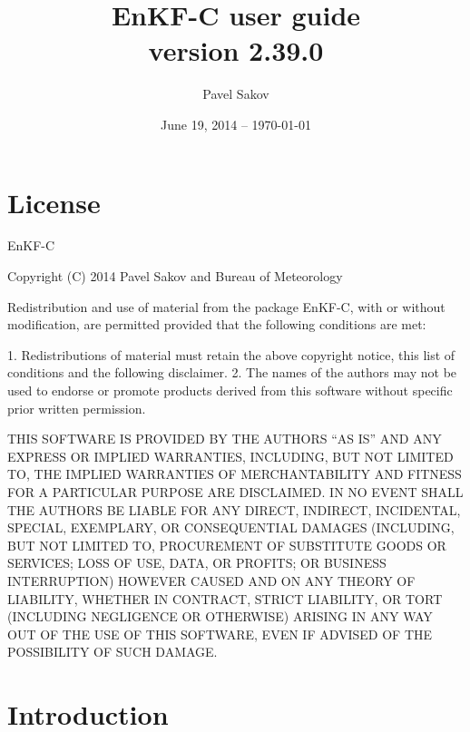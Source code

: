 \documentclass[11pt]{report}
\begin{document}
\title{EnKF-C user guide\\{\normalsize version 2.39.0}}

\author{Pavel Sakov}
\date{June 19, 2014 -- \today}

\maketitle
\thispagestyle{empty}

\clearpage

\tableofcontents

\clearpage

\chapter*{License}

EnKF-C

Copyright (C) 2014 Pavel Sakov and Bureau of Meteorology

Redistribution and use of material from the package EnKF-C, with or without
modification, are permitted provided that the following conditions are 
met:

   1. Redistributions of material must retain the above copyright notice, this
      list of conditions and the following disclaimer.
   2. The names of the authors may not be used to endorse or promote products
      derived from this software without specific prior written permission.

THIS SOFTWARE IS PROVIDED BY THE AUTHORS ``AS IS'' AND ANY EXPRESS OR IMPLIED 
WARRANTIES, INCLUDING, BUT NOT LIMITED TO, THE IMPLIED WARRANTIES OF
MERCHANTABILITY AND FITNESS FOR A PARTICULAR PURPOSE ARE DISCLAIMED. IN NO
EVENT SHALL THE AUTHORS BE LIABLE FOR ANY DIRECT, INDIRECT, INCIDENTAL, SPECIAL,
EXEMPLARY, OR CONSEQUENTIAL DAMAGES (INCLUDING, BUT NOT LIMITED TO, PROCUREMENT
OF SUBSTITUTE GOODS OR SERVICES; LOSS OF USE, DATA, OR PROFITS; OR BUSINESS
INTERRUPTION) HOWEVER CAUSED AND ON ANY THEORY OF LIABILITY, WHETHER IN
CONTRACT, STRICT LIABILITY, OR TORT (INCLUDING NEGLIGENCE OR OTHERWISE) ARISING
IN ANY WAY OUT OF THE USE OF THIS SOFTWARE, EVEN IF ADVISED OF THE POSSIBILITY
OF SUCH DAMAGE.

\chapter*{Introduction}
\end{document}
